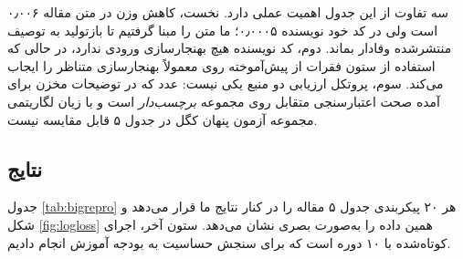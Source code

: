 سه تفاوت از این جدول اهمیت عملی دارد. نخست، کاهش وزن  در متن مقاله \num{۰٫۰۰۶} است ولی در کد خود نویسنده \num{۰٫۰۰۰۵}؛ ما متن را مبنا گرفتیم تا بازتولید به توصیف منتشرشده وفادار بماند. دوم، کد نویسنده هیچ بهنجارسازی ورودی ندارد، در حالی که استفاده از ستون فقرات از پیش‌آموخته روی  معمولاً بهنجارسازی متناظر را ایجاب می‌کند. سوم، پروتکل ارزیابی دو منبع یکی نیست: عدد  که در توضیحات مخزن برای  آمده صحت اعتبارسنجی متقابل روی مجموعه \emph{برچسب‌دار} است و با زیان لگاریتمی مجموعه آزمون پنهان کگل در جدول ۵ قابل مقایسه نیست.

\subsection{نتایج}
جدول \ref{tab:bigrepro} هر ۲۰ پیکربندی جدول ۵ مقاله را در کنار نتایج ما قرار می‌دهد و شکل \ref{fig:logloss} همین داده را به‌صورت بصری نشان می‌دهد. ستون آخر، اجرای کوتاه‌شده با ۱۰ دوره است که برای سنجش حساسیت به بودجه آموزش انجام دادیم.


